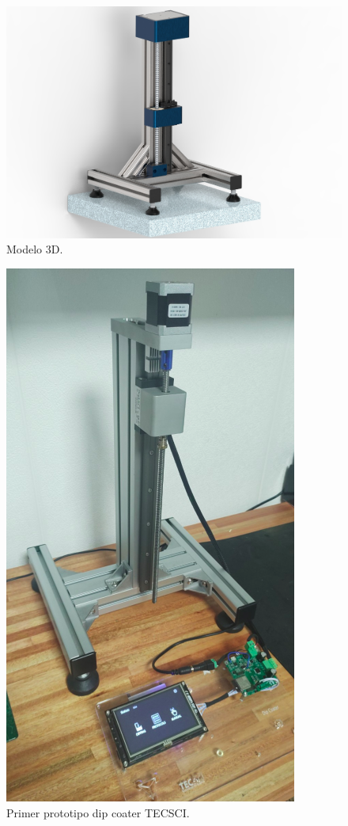 \begin{figure}[ht]
	\centering
	\includegraphics[width=.8\textwidth]{./Figures/3d.jpg}
	\caption{Modelo 3D.}
	\label{fig:mecanica_3d_model}
\end{figure}

\begin{figure}[ht]
	\centering
	\includegraphics[width=.5\textwidth]{./Figures/real.png}
	\caption{Primer prototipo dip coater TECSCI.}
	\label{fig:mecanica_real_model}
\end{figure}